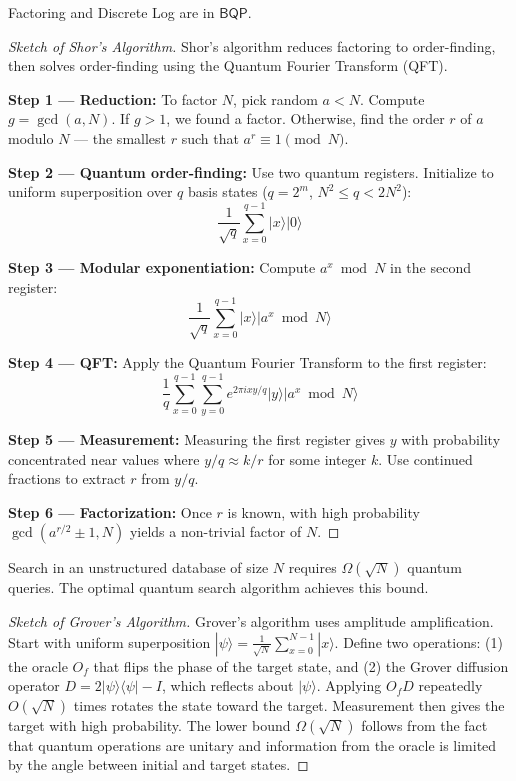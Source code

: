 \begin{theorem}[Shor 1994]
Factoring and Discrete Log are in $\mathsf{BQP}$.
\end{theorem}

\begin{proof}[Sketch of Shor's Algorithm]
Shor's algorithm reduces factoring to order-finding, then solves order-finding using the Quantum Fourier Transform (QFT).

\textbf{Step 1 — Reduction:} To factor $N$, pick random $a < N$. Compute $g = \gcd(a, N)$. If $g > 1$, we found a factor. Otherwise, find the order $r$ of $a$ modulo $N$ — the smallest $r$ such that $a^r \equiv 1 \pmod{N}$.

\textbf{Step 2 — Quantum order-finding:} Use two quantum registers. Initialize to uniform superposition over $q$ basis states ($q = 2^m$, $N^2 \le q < 2N^2$):
\[
\frac{1}{\sqrt{q}} \sum_{x=0}^{q-1} |x\rangle |0\rangle
\]

\textbf{Step 3 — Modular exponentiation:} Compute $a^x \bmod N$ in the second register:
\[
\frac{1}{\sqrt{q}} \sum_{x=0}^{q-1} |x\rangle |a^x \bmod N\rangle
\]

\textbf{Step 4 — QFT:} Apply the Quantum Fourier Transform to the first register:
\[
\frac{1}{q} \sum_{x=0}^{q-1} \sum_{y=0}^{q-1} e^{2\pi i xy/q} |y\rangle |a^x \bmod N\rangle
\]

\textbf{Step 5 — Measurement:} Measuring the first register gives $y$ with probability concentrated near values where $y/q \approx k/r$ for some integer $k$. Use continued fractions to extract $r$ from $y/q$.

\textbf{Step 6 — Factorization:} Once $r$ is known, with high probability $\gcd(a^{r/2} \pm 1, N)$ yields a non-trivial factor of $N$.
\end{proof}

\begin{theorem}[Grover 1996]
Search in an unstructured database of size $N$ requires $\Omega(\sqrt{N})$ quantum queries. The optimal quantum search algorithm achieves this bound.
\end{theorem}

\begin{proof}[Sketch of Grover's Algorithm]
Grover's algorithm uses amplitude amplification. Start with uniform superposition $|\psi\rangle = \frac{1}{\sqrt{N}} \sum_{x=0}^{N-1} |x\rangle$. Define two operations: (1) the oracle $O_f$ that flips the phase of the target state, and (2) the Grover diffusion operator $D = 2|\psi\rangle\langle\psi| - I$, which reflects about $|\psi\rangle$. Applying $O_f D$ repeatedly $O(\sqrt{N})$ times rotates the state toward the target. Measurement then gives the target with high probability. The lower bound $\Omega(\sqrt{N})$ follows from the fact that quantum operations are unitary and information from the oracle is limited by the angle between initial and target states.
\end{proof}

